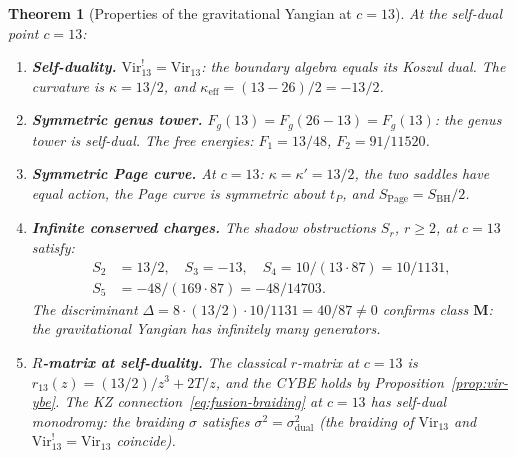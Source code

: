 \documentclass[11pt,reqno]{amsart}
\newtheorem{theorem}{Theorem}[section]
\theoremstyle{definition}
\theoremstyle{remark}
\begin{document}
\begin{theorem}[Properties of the gravitational Yangian at $c = 13$]
\label{thm:gravitational-yangian}
At the self-dual point $c = 13$:
\begin{enumerate}[label=\textup{(\roman*)}]
\item \textbf{Self-duality.}
  $\mathrm{Vir}_{13}^! = \mathrm{Vir}_{13}$:
  the boundary algebra equals its Koszul dual. The
  curvature is $\kappa = 13/2$,
  and $\kappa_{\mathrm{eff}} = (13-26)/2 = -13/2$.
\item \textbf{Symmetric genus tower.}
  $F_g(13) = F_g(26-13) = F_g(13)$: the genus tower is
  self-dual. The free energies:
  $F_1 = 13/48$, $F_2 = 91/11520$.
\item \textbf{Symmetric Page curve.}
  At $c = 13$: $\kappa = \kappa' = 13/2$, the two saddles have
  equal action, the Page curve is symmetric about $t_P$, and
  $S_{\mathrm{Page}} = S_{\mathrm{BH}}/2$.
\item \textbf{Infinite conserved charges.}
  The shadow obstructions $S_r$, $r \ge 2$, at $c = 13$ satisfy:
  \begin{align}
  S_2 &= 13/2, \quad S_3 = -13, \quad
  S_4 = 10/(13 \cdot 87) = 10/1131,
    \label{eq:shadow-c13}\\
  S_5 &= -48/(169 \cdot 87) = -48/14703.
    \label{eq:shadow-c13-5}
  \end{align}
  The discriminant $\Delta = 8 \cdot (13/2) \cdot 10/1131
  = 40/87 \ne 0$ confirms class $\mathbf{M}$: the gravitational
  Yangian has infinitely many generators.
\item \textbf{$R$-matrix at self-duality.}
  The classical $r$-matrix at $c = 13$ is
  $r_{13}(z) = (13/2)/z^3 + 2T/z$,
  and the CYBE holds by
  Proposition~\textup{\ref{prop:vir-ybe}}.
  The KZ connection~\eqref{eq:fusion-braiding} at $c = 13$ has
  self-dual monodromy: the braiding $\sigma$ satisfies
  $\sigma^2 = \sigma_{\mathrm{dual}}^2$ (the braiding of
  $\mathrm{Vir}_{13}$ and $\mathrm{Vir}_{13}^! = \mathrm{Vir}_{13}$
  coincide).
\end{enumerate}
\end{theorem}
\end{document}

